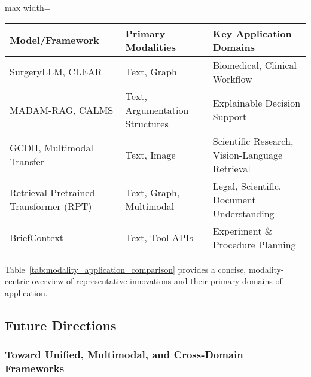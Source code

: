 \documentclass[sigconf]{acmart}
\begin{document}
\begin{table*}[htbp]
\centering
\caption{Representative Innovations in Knowledge-Augmented AI: Modalities and Applications}
\label{tab:modality_application_comparison}
\begin{adjustbox}{max width=\textwidth}
\begin{tabular}{lll}
\toprule
\textbf{Model/Framework}        & \textbf{Primary Modalities}                   & \textbf{Key Application Domains}                 \\
\midrule
SurgeryLLM, CLEAR               & Text, Graph                                   & Biomedical, Clinical Workflow                   \\
MADAM-RAG, CALMS                & Text, Argumentation Structures                & Explainable Decision Support                    \\
GCDH, Multimodal Transfer       & Text, Image                                   & Scientific Research, Vision-Language Retrieval  \\
Retrieval-Pretrained Transformer (RPT) & Text, Graph, Multimodal                         & Legal, Scientific, Document Understanding       \\
BriefContext                    & Text, Tool APIs                               & Experiment \& Procedure Planning                \\
\bottomrule
\end{tabular}
\end{adjustbox}
\end{table*}

Table~\ref{tab:modality_application_comparison} provides a concise, modality-centric overview of representative innovations and their primary domains of application.

\subsection{Future Directions}

\subsubsection{Toward Unified, Multimodal, and Cross-Domain Frameworks}
\end{document}
